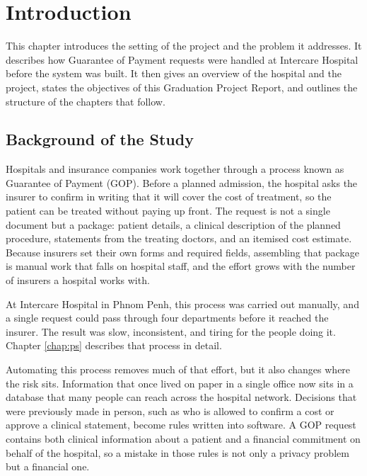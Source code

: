 \chapter{Introduction}
\label{chap:intro}

This chapter introduces the setting of the project and the problem it addresses. It describes how Guarantee of Payment requests were handled at Intercare Hospital before the system was built. It then gives an overview of the hospital and the project, states the objectives of this Graduation Project Report, and outlines the structure of the chapters that follow.

\section{Background of the Study}
\label{sec:intro-background}

Hospitals and insurance companies work together through a process known as Guarantee of Payment (GOP). Before a planned admission, the hospital asks the insurer to confirm in writing that it will cover the cost of treatment, so the patient can be treated without paying up front. The request is not a single document but a package: patient details, a clinical description of the planned procedure, statements from the treating doctors, and an itemised cost estimate. Because insurers set their own forms and required fields, assembling that package is manual work that falls on hospital staff, and the effort grows with the number of insurers a hospital works with.

At Intercare Hospital in Phnom Penh, this process was carried out manually, and a single request could pass through four departments before it reached the insurer. The result was slow, inconsistent, and tiring for the people doing it. Chapter \ref{chap:ps} describes that process in detail.

Automating this process removes much of that effort, but it also changes where the risk sits. Information that once lived on paper in a single office now sits in a database that many people can reach across the hospital network. Decisions that were previously made in person, such as who is allowed to confirm a cost or approve a clinical statement, become rules written into software. A GOP request contains both clinical information about a patient and a financial commitment on behalf of the hospital, so a mistake in those rules is not only a privacy problem but a financial one.

